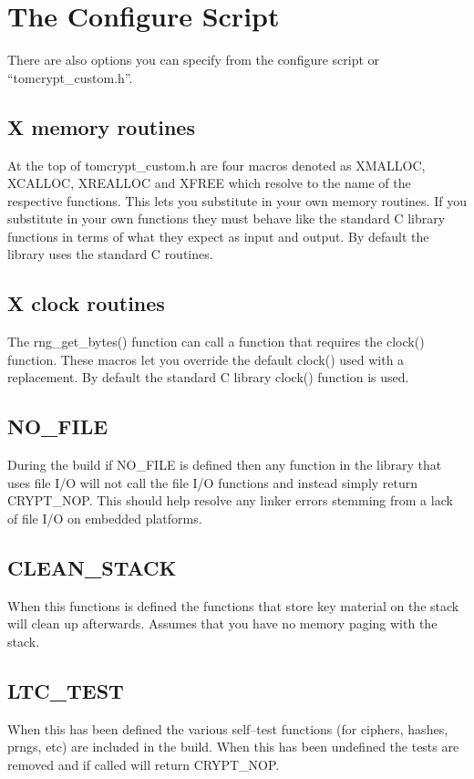 \documentclass[a4paper]{book}
\begin{document}
\section{The Configure Script}
There are also options you can specify from the configure script or ``tomcrypt\_custom.h''.  

\subsection{X memory routines}
At the top of tomcrypt\_custom.h are four macros denoted as XMALLOC, XCALLOC, XREALLOC and XFREE which resolve to 
the name of the respective functions.  This lets you substitute in your own memory routines.  If you substitute in 
your own functions they must behave like the standard C library functions in terms of what they expect as input and 
output.  By default the library uses the standard C routines.

\subsection{X clock routines}
The rng\_get\_bytes() function can call a function that requires the clock() function.  These macros let you override
the default clock() used with a replacement.  By default the standard C library clock() function is used.

\subsection{NO\_FILE}
During the build if NO\_FILE is defined then any function in the library that uses file I/O will not call the file I/O 
functions and instead simply return CRYPT\_NOP.  This should help resolve any linker errors stemming from a lack of
file I/O on embedded platforms.

\subsection{CLEAN\_STACK}
When this functions is defined the functions that store key material on the stack will clean up afterwards.  
Assumes that you have no memory paging with the stack.

\subsection{LTC\_TEST}
When this has been defined the various self--test functions (for ciphers, hashes, prngs, etc) are included in the build.
When this has been undefined the tests are removed and if called will return CRYPT\_NOP.
\end{document}

